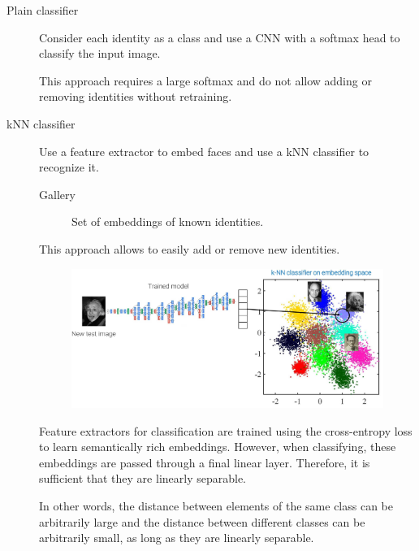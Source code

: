 \begin{description}
    \item[Plain classifier] 
        Consider each identity as a class and use a CNN with a softmax head to classify the input image.

        \begin{remark}
            This approach requires a large softmax and do not allow adding or removing identities without retraining.
        \end{remark}

    \item[kNN classifier] 
        Use a feature extractor to embed faces and use a kNN classifier to recognize it.

        \begin{description}
            \item[Gallery] 
                Set of embeddings of known identities.
        \end{description}

        \begin{remark}
            This approach allows to easily add or remove new identities.
        \end{remark}

        \begin{figure}[H]
            \centering
            \includegraphics[width=0.7\linewidth]{./img/_cnn_knn_face_recognition.jpg}
        \end{figure}

        \begin{remark}
            Feature extractors for classification are trained using the cross-entropy loss to learn semantically rich embeddings. However, when classifying, these embeddings are passed through a final linear layer. Therefore, it is sufficient that they are linearly separable.

            In other words, the distance between elements of the same class can be arbitrarily large and the distance between different classes can be arbitrarily small, as long as they are linearly separable.


\end{remark}
\end{description}
